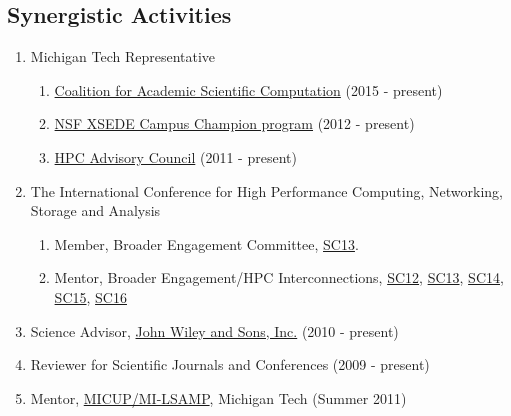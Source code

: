 %
\subsection*{Synergistic Activities}

\begin{enumerate}
  \item \textsf{Michigan Tech Representative}
        \begin{enumerate}
          \item \href{http://casc.org}{Coalition for Academic Scientific Computation} (2015 - present)
          \item \href{http://xsede.org}{NSF XSEDE Campus Champion program} (2012 - present)
          \item \href{http://hpcadvisorycouncil.com}{HPC Advisory Council} (2011 - present)
        \end{enumerate}

  \item \textsf{The International Conference for High Performance Computing,
        Networking, Storage and Analysis}
        \begin{enumerate}
          \item \textsf{Member}, Broader Engagement Committee, \href{http://sc13.supercomputing.org/}{SC13}.
          \item \textsf{Mentor}, Broader Engagement/HPC Interconnections, \href{http://sc12.supercomputing.org/}{SC12},  \href{http://sc13.supercomputing.org/}{SC13}, \href{http://sc14.supercomputing.org/}{SC14}, \href{http://sc15.supercomputing.org/}{SC15}, \href{http://sc1..supercomputing.org/}{SC16}
        \end{enumerate}

  \item Science Advisor, \href{http://exchanges.wiley.com/advisors}{John Wiley and Sons, Inc.} (2010 - present)

  \item Reviewer for Scientific Journals and Conferences (2009 - present)

  \item Mentor, \href{http://www.mtu.edu/diversity-center/programs/students/micup-milsamp/}{MICUP/MI-LSAMP}, Michigan Tech (Summer 2011)
\end{enumerate}
